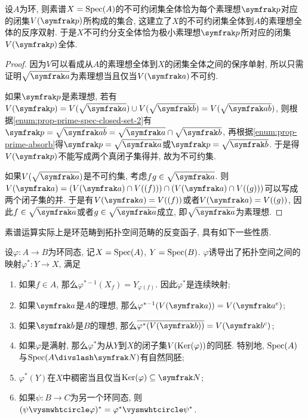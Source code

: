 \begin{proposition}
  设$A$为环, 则素谱$X=\operatorname{Spec} (A)$的不可约闭集全体恰为每个素理想$\ideal{p}$对应的闭集$V(\ideal{p})$所构成的集合, 这建立了$X$的不可约闭集全体到$A$的素理想全体的反序双射. 于是$X$不可约分支全体恰为极小素理想$\ideal{p}$所对应的闭集$V(\ideal{p})$全体.
\end{proposition}

\begin{proof}
  因为$V$可以看成从$A$的素理想全体到$X$的闭集全体之间的保序单射, 所以只需证明$\sqrt{\ideal{a}}$为素理想当且仅当$V(\ideal{a})$不可约.

  如果$\ideal{p}$是素理想, 若有$V(\ideal{p})=V(\sqrt{\ideal{a}})\cup V(\sqrt{\ideal{b}})=V(\sqrt{\ideal{ab}})$, 则根据\ref{enum:prop-prime-spec-closed-set-2}有$\ideal{p}=\sqrt{\ideal{ab}}=\sqrt{\ideal{a}}\cap\sqrt{\ideal{b}}$, 再根据\ref{enum:prop-prime-absorb}得$\ideal{p}=\sqrt{\ideal{a}}$或$\ideal{p}=\sqrt{\ideal{b}}$. 于是得$V(\ideal{p})$不能写成两个真闭子集得并, 故为不可约集.

  如果$V(\sqrt{\ideal{a}})$是不可约集, 考虑$fg\in\sqrt{\ideal{a}}$. 则$V(\ideal{a})=(V(\ideal{a})\cap V((f)))\cap (V(\ideal{a})\cap V((g)))$可以写成两个闭子集的并. 于是有$V(\ideal{a})=V((f))$或者$V(\ideal{a})=V((g))$, 因此$f\in \sqrt{\ideal{a}}$或者$g\in \sqrt{\ideal{a}}$成立, 即$\sqrt{\ideal{a}}$为素理想.
\end{proof}

素谱运算实际上是环范畴到拓扑空间范畴的反变函子, 具有如下一些性质.

\begin{proposition}\label{prop:primespecfunctor}
  设$\varphi\colon A\to B$为环同态, 记$X=\operatorname{Spec} (A)$, $Y=\operatorname{Spec} (B)$. $\varphi$诱导出了拓扑空间之间的映射$\varphi^*\colon Y\to X$, 满足
  \begin{enumerate}
    \item\label{enum:prop-prime-spec-functor-continuous} 如果$f\in A$, 那么$\varphi^{*-1}(X_f)=Y_{\varphi(f)}$. 因此$\varphi^*$是连续映射;
    \item 如果$\ideal{a}$是$A$的理想, 那么$\varphi^{*-1}(V(\ideal{a}))=V(\ideal{a}^e)$;
    \item 如果$\ideal{b}$是$B$的理想, 那么$\overline{\varphi^*(V(\ideal{b}))}=V(\ideal{b}^c)$;
    \item\label{enum:prop-prime-spec-functor-surjective} 如果$\varphi$是满射, 那么$\varphi^*$为从$Y$到$X$的闭子集$V(\operatorname{Ker} (\varphi))$的同胚. 特别地, $\operatorname{Spec} (A)$与$\Spec (A{\divslash}\nil)$有自然同胚;
    \item $\varphi^*(Y)$在$X$中稠密当且仅当$\Ker (\varphi)\subseteq \nil$;
    \item\label{enum:prop-prime-spec-functor-composite} 如果$\psi\colon B\to C$为另一个环同态, 则$(\psi\composite\varphi)^*=\varphi^*\composite\psi^*$.
  \end{enumerate}
\end{proposition}

